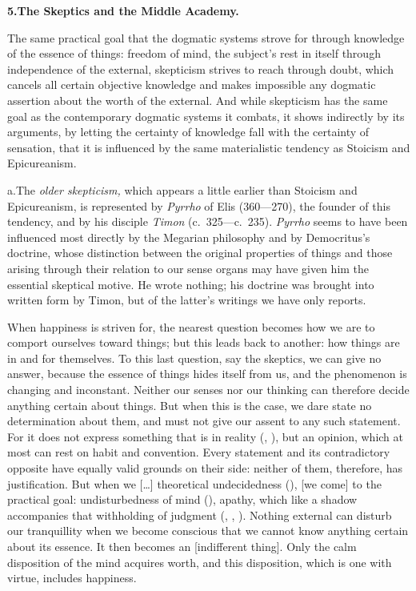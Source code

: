 \divrule

\begin{center}
\textbf{5.\enspace The Skeptics and the Middle Academy.}
\end{center}

The same practical goal that the dogmatic systems strove for through
knowledge of the essence of things: freedom of mind, the subject's
rest in itself through independence of the external, skepticism
strives to reach through doubt, which cancels all certain objective
knowledge and makes impossible any dogmatic assertion about the worth of
the external. And while skepticism has the same goal as the
contemporary dogmatic systems it combats, it shows indirectly by its
arguments, by letting the certainty of knowledge fall with the certainty
of sensation, that it is influenced by the same materialistic tendency
as Stoicism and Epicureanism.

\divrule

a.\enspace The \emph{older skepticism,} which appears a little earlier
than Stoicism and Epicureanism, is represented by \emph{Pyrrho} of Elis
(360---270), the founder of this tendency, and by his disciple
\emph{Timon} (c.\ 325---c.\ 235). \emph{Pyrrho} seems to have been
influenced most directly by the Megarian philosophy and by Democritus's
doctrine, whose distinction between the original properties of things
and those arising through their relation to our sense organs may have
given him the essential skeptical motive. He wrote nothing; his doctrine
was brought into written form by Timon, but of the latter's writings we
have only reports.

When happiness is striven for, the nearest question becomes how we are
to comport ourselves toward things; but this leads back to
another: how things are in and for themselves. To this last question,
say the skeptics, we can give no answer, because the essence of things
hides itself from us, and the phenomenon is changing and inconstant.
Neither our senses nor our thinking can therefore decide anything
certain about things. But when this is the case, we dare state no
determination about them, and must not give our assent to any such
statement. For it does not express something that is in reality
(, ), but an opinion, which at most can rest on
habit and convention. Every statement and its contradictory opposite
have equally valid grounds on their side: neither of them, therefore,
has justification. But when we [\dots] theoretical undecidedness
(), [we come] to the practical goal: undisturbedness of mind
(), apathy, which like a shadow accompanies that withholding
of judgment (, , ). Nothing external
can disturb our tranquillity when we become conscious that we cannot
know anything certain about its essence. It then becomes an
 [indifferent thing]. Only the calm disposition of the
mind acquires worth, and this disposition, which is one with virtue,
includes happiness.


